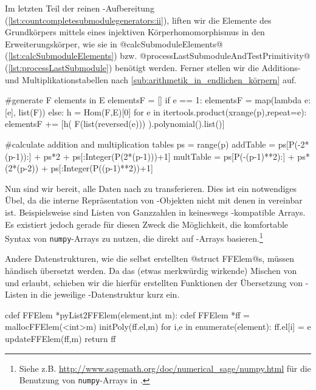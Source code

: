 Im letzten Teil der reinen \sage-Aufbereitung
(\autoref{lst:countcompletesubmodulegenerators:ii}), 
liften wir die Elemente des
Grundkörpers mittels eines injektiven Körperhomomorphismus in den
Erweiterungskörper, wie sie in @calcSubmoduleElements@
(\autoref{lst:calcSubmoduleElements}) bzw.
@processLastSubmoduleAndTestPrimitivity@
(\autoref{lst:processLastSubmodule}) benötigt werden. Ferner stellen wir die 
Additions- und Multiplikationstabellen nach 
\autoref{sub:arithmetik_in_endlichen_körpern} auf.

\begin{sagecode}[caption={\texttt{countCompleteSubmoduleGenerators}
  Fortsetzung (II)}, label=lst:countcompletesubmodulegenerators:ii]
        #generate F elements in E
    elementsF = []
    if e == 1:
        elementsF = map(lambda e: [e], list(F))
    else:
        h = Hom(F,E)[0]
        for e in itertools.product(xrange(p),repeat=e):
            elementsF += [h( F(list(reversed(e))) ).polynomial().list()]

        #calculate addition and multiplication tables
    ps = range(p)
    addTable = ps[P(-2*(p-1)):] + ps*2 + ps[:Integer(P(2*(p-1)))+1]
    multTable = ps[P(-(p-1)**2):] + ps*(2*(p-2)) + ps[:Integer(P((p-1)**2))+1]
\end{sagecode}  


Nun sind wir bereit, alle Daten nach \Clang zu transferieren. Dies ist ein
notwendiges Übel, da die interne Repräsentation von \sage-Objekten nicht mit
denen in \Clang vereinbar ist. Beispielsweise sind Listen von Ganzzahlen
in \sage keineswegs \Clang-kompatible Arrays. 
Es existiert jedoch gerade für diesen Zweck die Möglichkeit,
die komfortable Syntax von \texttt{numpy}-Arrays zu nutzen, die direkt auf 
\Clang-Arrays basieren.\footnote{Siehe z.B.
\url{http://www.sagemath.org/doc/numerical_sage/numpy.html} für die Benutzung
von \texttt{numpy}-Arrays in \sage.}

Andere Datenstrukturen, wie die selbst erstellten @struct FFElem@s, müssen
händisch übersetzt werden. Da \cython das (etwas merkwürdig wirkende) Mischen
von \python und \Clang erlaubt, schieben wir die hierfür erstellten Funktionen
der Übersetzung von \python-Listen in die jeweilige \Clang-Datenstruktur kurz
ein.

\begin{sagecode}[caption={[\texttt{FFElem *pyList2FFElem} aus 
 \url{../Sage/enumeratePCNs.spyx}]Aus \url{../Sage/enumeratePCNs.spyx}}]
cdef FFElem *pyList2FFElem(element,int m):
    cdef FFElem *ff = mallocFFElem(<int>m)
    initPoly(ff.el,m)
    for i,e in enumerate(element):
        ff.el[i] = e
    updateFFElem(ff,m)
    return ff
\end{sagecode}  

